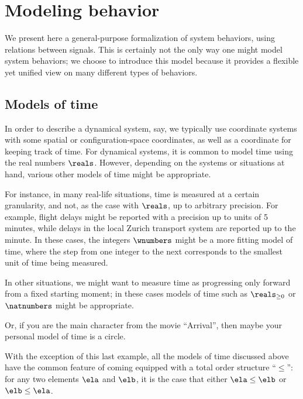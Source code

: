 
  \section{Modeling behavior}


    We present here a general-purpose formalization of system behaviors, using relations between signals. This is certainly not the only way one might model system behaviors; we choose to introduce this model because it provides a flexible yet unified view on many different types of behaviors.  
    
\subsection{Models of time}

In order to describe a dynamical system, say, we typically use coordinate systems with some spatial or configuration-space coordinates, as well as a coordinate for keeping track of time. For dynamical systems, it is common to model time using the real numbers $\reals$. However, depending on the systems or situations at hand, various other models of time might be appropriate. 

For instance, in many real-life situations, time is measured at a certain granularity, and not, as the case with $\reals$, up to arbitrary precision. For example, flight delays might be reported with a precision up to units of 5 minutes, while delays in the local Zurich transport system are reported up to the minute. In these cases, the integers $\wnumbers$ might be a more fitting model of time, where the step from one integer to the next corresponds to the smallest unit of time being measured. 

In other situations, we might want to measure time as progressing only forward from a fixed starting moment; in these cases models of time such as $\reals_{\geq 0}$ or $\natnumbers$ might be appropriate. 

Or, if you are the main character from the movie ``Arrival'', then maybe your personal model of time is a circle. 

With the exception of this last example, all the models of time discussed above have the common feature of coming equipped with a total order structure ``$\leq$'': for any two elements $\ela$ and $\elb$, it is the case that either $\ela \leq \elb$ or $\elb \leq \ela$. 


